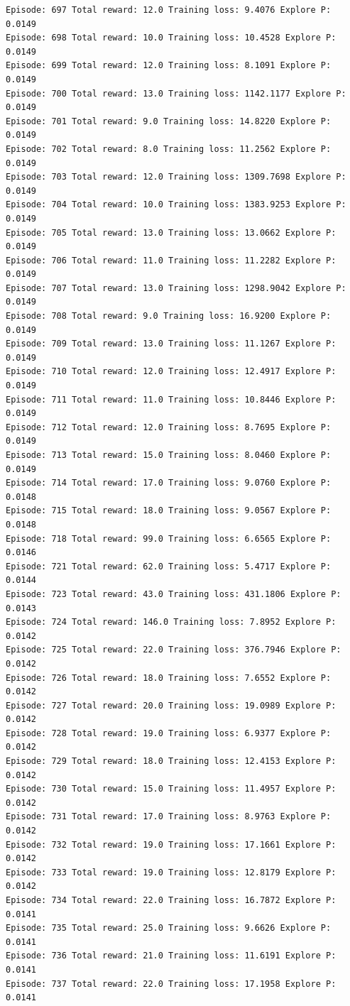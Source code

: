 \documentclass[11pt]{article}
\begin{document}
\begin{Verbatim}[commandchars=\\\{\}]
Episode: 697 Total reward: 12.0 Training loss: 9.4076 Explore P: 0.0149
Episode: 698 Total reward: 10.0 Training loss: 10.4528 Explore P: 0.0149
Episode: 699 Total reward: 12.0 Training loss: 8.1091 Explore P: 0.0149
Episode: 700 Total reward: 13.0 Training loss: 1142.1177 Explore P: 0.0149
Episode: 701 Total reward: 9.0 Training loss: 14.8220 Explore P: 0.0149
Episode: 702 Total reward: 8.0 Training loss: 11.2562 Explore P: 0.0149
Episode: 703 Total reward: 12.0 Training loss: 1309.7698 Explore P: 0.0149
Episode: 704 Total reward: 10.0 Training loss: 1383.9253 Explore P: 0.0149
Episode: 705 Total reward: 13.0 Training loss: 13.0662 Explore P: 0.0149
Episode: 706 Total reward: 11.0 Training loss: 11.2282 Explore P: 0.0149
Episode: 707 Total reward: 13.0 Training loss: 1298.9042 Explore P: 0.0149
Episode: 708 Total reward: 9.0 Training loss: 16.9200 Explore P: 0.0149
Episode: 709 Total reward: 13.0 Training loss: 11.1267 Explore P: 0.0149
Episode: 710 Total reward: 12.0 Training loss: 12.4917 Explore P: 0.0149
Episode: 711 Total reward: 11.0 Training loss: 10.8446 Explore P: 0.0149
Episode: 712 Total reward: 12.0 Training loss: 8.7695 Explore P: 0.0149
Episode: 713 Total reward: 15.0 Training loss: 8.0460 Explore P: 0.0149
Episode: 714 Total reward: 17.0 Training loss: 9.0760 Explore P: 0.0148
Episode: 715 Total reward: 18.0 Training loss: 9.0567 Explore P: 0.0148
Episode: 718 Total reward: 99.0 Training loss: 6.6565 Explore P: 0.0146
Episode: 721 Total reward: 62.0 Training loss: 5.4717 Explore P: 0.0144
Episode: 723 Total reward: 43.0 Training loss: 431.1806 Explore P: 0.0143
Episode: 724 Total reward: 146.0 Training loss: 7.8952 Explore P: 0.0142
Episode: 725 Total reward: 22.0 Training loss: 376.7946 Explore P: 0.0142
Episode: 726 Total reward: 18.0 Training loss: 7.6552 Explore P: 0.0142
Episode: 727 Total reward: 20.0 Training loss: 19.0989 Explore P: 0.0142
Episode: 728 Total reward: 19.0 Training loss: 6.9377 Explore P: 0.0142
Episode: 729 Total reward: 18.0 Training loss: 12.4153 Explore P: 0.0142
Episode: 730 Total reward: 15.0 Training loss: 11.4957 Explore P: 0.0142
Episode: 731 Total reward: 17.0 Training loss: 8.9763 Explore P: 0.0142
Episode: 732 Total reward: 19.0 Training loss: 17.1661 Explore P: 0.0142
Episode: 733 Total reward: 19.0 Training loss: 12.8179 Explore P: 0.0142
Episode: 734 Total reward: 22.0 Training loss: 16.7872 Explore P: 0.0141
Episode: 735 Total reward: 25.0 Training loss: 9.6626 Explore P: 0.0141
Episode: 736 Total reward: 21.0 Training loss: 11.6191 Explore P: 0.0141
Episode: 737 Total reward: 22.0 Training loss: 17.1958 Explore P: 0.0141

\end{Verbatim}
\end{document}

